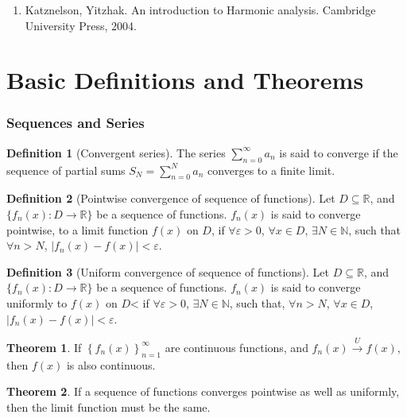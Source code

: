 \documentclass[fleqn, a4paper, 12pt, twoside]{article}
\theoremstyle{definition}
\newtheorem{definition}{Definition}
\theoremstyle{theorem}
\newtheorem{theorem}{Theorem}
\begin{document}
\begin{enumerate}
	\item Katznelson, Yitzhak. An introduction to Harmonic analysis. Cambridge University Press, 2004.
\end{enumerate}

\newpage
\part{Basic Definitions and Theorems}
\section{Sequences and Series}

\begin{definition}[Convergent series]
	The series $\sum\limits_{n = 0}^{\infty} a_n$ is said to converge if the sequence of partial sums $S_N = \sum\limits_{n = 0}^{N} a_n$ converges to a finite limit.
\end{definition}

\begin{definition}[Pointwise convergence of sequence of functions]
	Let $D \subseteq \mathbb{R}$, and $\{f_n(x) : D \to \mathbb{R}\}$ be a sequence of functions.
	$f_n(x)$ is said to converge pointwise, to a limit function $f(x)$ on $D$, if $\forall \varepsilon > 0$, $\forall x \in D$, $\exists N \in \mathbb{N}$, such that $\forall n > N$, $\left| f_n(x) - f(x) \right| < \varepsilon$.
\end{definition}

\begin{definition}[Uniform convergence of sequence of functions]
	Let $D \subseteq \mathbb{R}$, and $\{f_n(x) : D \to \mathbb{R}\}$ be a sequence of functions.
	$f_n(x)$ is said to converge uniformly to $f(x)$ on $D$< if $\forall \varepsilon > 0$, $\exists N \in \mathbb{N}$, such that, $\forall n > N$, $\forall x \in D$, $\left| f_n(x) - f(x) \right| < \varepsilon$.
\end{definition}

\begin{theorem}
	If $\left\{ f_n(x) \right\}_{n = 1}^{\infty}$ are continuous functions, and $f_n(x) \xrightarrow{U} f(x)$, then $f(x)$ is also continuous.
\end{theorem}

\begin{theorem}
	If a sequence of functions converges pointwise as well as uniformly, then the limit function must be the same.
\end{theorem}
\end{document}
